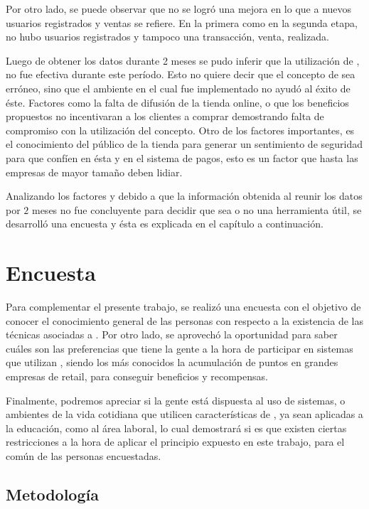 Por otro lado, se puede observar que no se logró una mejora en lo que a nuevos
usuarios registrados y ventas se refiere.
En la primera como en la segunda etapa, no hubo usuarios registrados y tampoco
una transacción, venta, realizada.

Luego de obtener los datos durante 2 meses se pudo inferir que la utilización
de {\gam}, no fue efectiva durante este período. Esto no quiere decir que el concepto
de {\gam} sea erróneo, sino que el ambiente en el cual fue implementado no ayudó
al éxito de éste. Factores como la falta de difusión de la tienda online,
 o que los beneficios propuestos no incentivaran a
 los clientes a comprar demostrando falta de compromiso con la utilización del
concepto. Otro de los factores importantes, es el conocimiento del público de la tienda 
para generar un sentimiento de seguridad para que confíen en ésta y en el sistema de pagos, 
esto es un factor que hasta las empresas de mayor tamaño deben lidiar.

Analizando los factores y debido a que la información obtenida al reunir los datos por $2$
 meses no fue concluyente para decidir que {\gam} sea o no una herramienta útil, se
desarrolló una encuesta y ésta es explicada en el capítulo a continuación.

\section{Encuesta}

Para complementar el presente trabajo, se realizó una encuesta con el objetivo de
conocer el conocimiento general de las personas con respecto a la existencia
de las técnicas asociadas a {\gam}.
Por otro lado, se aprovechó la oportunidad para saber cuáles son las preferencias
que tiene la gente a la hora de participar en sistemas que utilizan {\gam},
siendo los más conocidos la acumulación de puntos en grandes empresas de retail,
para conseguir beneficios y recompensas.

Finalmente, podremos apreciar si la gente está dispuesta al uso de sistemas,
o ambientes de la vida cotidiana que utilicen características de {\gam},
ya sean aplicadas a la educación, como al área laboral, lo cual demostrará
 si es que existen ciertas restricciones a la hora de aplicar
el principio expuesto en este trabajo, para el común de las personas
encuestadas.

\subsection{Metodología}

